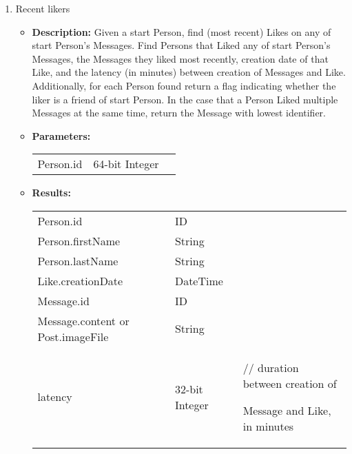{\begin{enumerate}
      \item Recent likers
        \begin{itemize}
            \item \textbf{Description:}
                Given a start Person, find (most recent) Likes on any of start
                Person's Messages.  Find Persons that Liked any of start
                Person's Messages, the Messages they liked most recently,
                creation date of that Like, and the latency (in minutes) between
                creation of Messages and Like.  Additionally, for each Person
                found return a flag indicating whether the liker is a friend of
                start Person.  In the case that a Person Liked multiple Messages
                at the same time, return the Message with lowest identifier.
            \item \textbf{Parameters:} \\
                \begin{tabular}{lll}
                    Person.id 	 						& 64-bit Integer & \parbox[t]{20cm}{\par \strut} \\
                \end{tabular}
            \item \textbf{Results:} \\
                \begin{tabular}{lll}
                    Person.id 	 								& ID & \parbox[t]{20cm}{\par \strut} \\
                    Person.firstName 							& String & \parbox[t]{20cm}{\par \strut} \\
                    Person.lastName 	 						& String & \parbox[t]{20cm}{\par \strut} \\
                    Like.creationDate 	 						& DateTime & \parbox[t]{20cm}{\par \strut} \\
                    Message.id 	 						& ID & \parbox[t]{20cm}{\par \strut} \\
                    Message.content or Post.imageFile	& String & \parbox[t]{20cm}{\par \strut} \\
                    latency 	 								& 32-bit Integer &
                    \parbox[t]{20cm}{// duration between creation of\par Message and Like, in minutes\strut} \\

\end{tabular}
\end{itemize}
\end{enumerate}}
